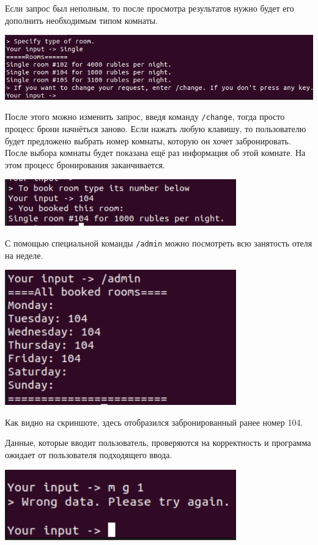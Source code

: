 \documentclass[oneside,final,14pt]{extarticle}
\begin{document}
Если запрос был неполным, то после просмотра результатов нужно будет его дополнить 
необходимым типом комнаты.
\begin{center}
    \includegraphics[width=\textwidth]{picture4.png}
\end{center}

После этого можно изменить запрос, введя команду \texttt{/change}, тогда просто процесс 
брони начнёться заново. Если нажать любую клавишу, то пользователю будет предложено выбрать 
номер комнаты, которую он хочет забронировать. После выбора комнаты будет показана ещё 
раз информация об этой комнате. На этом процесс бронирования заканчивается.
\begin{center}
    \includegraphics[width=0.75\textwidth]{picture5.png}
\end{center}

С помощью специальной команды \texttt{/admin} можно посмотреть всю занятость отеля на 
неделе.
\begin{center}
    \includegraphics[width=0.75\textwidth]{picture6.png}
\end{center}

Как видно на скриншоте, здесь отобразился забронированный ранее номер 104.

Данные, которые вводит пользователь, проверяются на корректность и программа ожидает 
от пользователя подходящего ввода.
\begin{center}
    \includegraphics[width=0.75\textwidth]{picture71.png}
\end{center}
\end{document}
